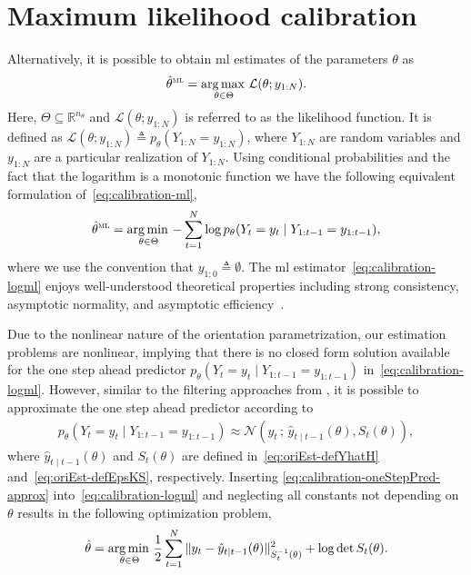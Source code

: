 \section{Maximum likelihood calibration}%
\label{sec:calibration-ml}%
Alternatively, it is possible to obtain \gls{ml} estimates of the parameters $\theta$ as
\begin{align}
\label{eq:calibration-ml}
\hat{\theta}^{\textsc{ml}} = \operatorname*{arg \, max \,}_{\theta\in\Theta} \mathcal{L}(\theta ; y_{1:N}).
\end{align}
Here, $\Theta \subseteq\mathbb{R}^{n_{\theta}}$ and $\mathcal{L}(\theta ; y_{1:N})$ is referred to as the likelihood function. It is defined as $\mathcal{L}(\theta ; y_{1:N}) \triangleq p_\theta(Y_{1:N} = y_{1:N})$, where $Y_{1:N}$ are random variables and $y_{1:N}$ are a particular realization of $Y_{1:N}$. Using conditional probabilities and the fact that the logarithm is a monotonic function we have the following equivalent formulation of~\eqref{eq:calibration-ml},
\begin{align}
  \label{eq:calibration-logml}
  \hat{\theta}^{\textsc{ml}} = \operatorname*{arg \, min \,}_{\theta\in\Theta}{-\sum_{t=1}^{N}\log p_{\theta}(Y_t = y_{t} \mid
    Y_{1:t-1} = y_{1:t-1})},
\end{align}
where we use the convention that $y_{1:0} \triangleq \emptyset$. 
The \gls{ml} estimator~\eqref{eq:calibration-logml} enjoys well-understood theoretical properties including strong consistency, asymptotic normality, and asymptotic efficiency~\citep{ljung:1999}.

Due to the nonlinear nature of the orientation parametrization, our estimation problems are nonlinear, implying that there is no closed form solution available for the one
step ahead predictor $p_{\theta}(Y_t = y_{t}\mid Y_{1:t-1} = y_{1:t-1})$ in~\eqref{eq:calibration-logml}. However, similar to the filtering approaches from , it is possible to approximate the one step ahead predictor according to
\begin{align}
  \label{eq:calibration-oneStepPred-approx}
  p_{\theta}(Y_t = y_t \mid Y_{1:t-1} = y_{1:t-1}) \approx \mathcal{N}\left(y_t \, ; \, \hat{y}_{t\mid t-1}(\theta), S_t (\theta) \right),
\end{align}
where $\hat{y}_{t\mid t-1}(\theta)$ and $S_t(\theta)$ are defined in~\eqref{eq:oriEst-defYhatH} and~\eqref{eq:oriEst-defEpsKS}, respectively. Inserting \eqref{eq:calibration-oneStepPred-approx} into~\eqref{eq:calibration-logml} and neglecting all constants not depending on $\theta$ results in the following optimization problem,
\begin{align}
  \label{eq:calibration-MLapprox}
  \hat{\theta} = \operatorname*{arg \, min \,}_{\theta\in\Theta} \frac{1}{2}\sum_{t=1}^{N}\|y_t - \hat{y}_{t\mid t-1}(\theta)\|_{S_t^{-1}(\theta)}^2 + \log\det S_t (\theta).
\end{align}

